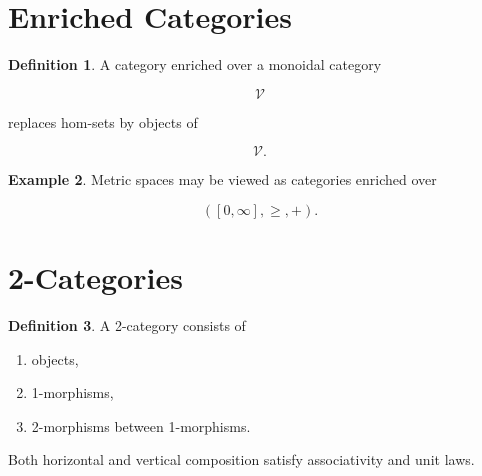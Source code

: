 \documentclass[11pt]{book}
\numberwithin{equation}{chapter}
\theoremstyle{definition}
\newtheorem{definition}{Definition}[chapter]
\newtheorem{example}[definition]{Example}
\theoremstyle{plain}
\begin{document}

\section{Enriched Categories}

\begin{definition}

A category enriched over a monoidal category

\[
\mathcal V
\]

replaces hom-sets by objects of

\[
\mathcal V.
\]

\end{definition}


\begin{example}

Metric spaces may be viewed as categories enriched over

\[
([0,\infty],\ge,+).
\]

\end{example}


\section{2-Categories}

\begin{definition}

A 2-category consists of

\begin{enumerate}

\item objects,

\item 1-morphisms,

\item 2-morphisms between 1-morphisms.

\end{enumerate}

Both horizontal and vertical composition satisfy associativity and unit
laws.

\end{definition}

\end{document}
